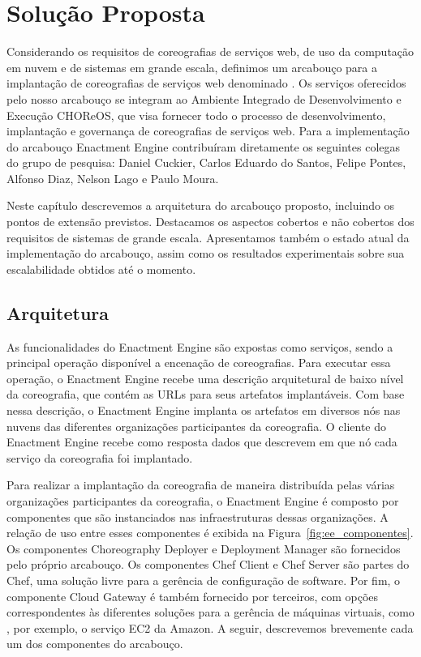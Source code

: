 
\chapter{Solução Proposta}
\label{cap:solucao}

Considerando os requisitos de coreografias de serviços web, de uso da computação em nuvem e de sistemas em grande escala, definimos um arcabouço para a implantação de coreografias de serviços web denominado \ee. Os serviços oferecidos pelo nosso arcabouço se integram ao Ambiente Integrado de Desenvolvimento e Execução CHOReOS, que visa fornecer todo o processo de desenvolvimento, implantação e governança de coreografias de serviços web. Para a implementação do arcabouço Enactment Engine contribuíram diretamente os seguintes colegas do grupo de pesquisa: Daniel Cuckier, Carlos Eduardo do Santos, Felipe Pontes, Alfonso Diaz, Nelson Lago e Paulo Moura. 

Neste capítulo descrevemos a arquitetura do arcabouço proposto, incluindo os pontos de extensão previstos. Destacamos os aspectos cobertos e não cobertos dos requisitos de sistemas de grande escala. Apresentamos também o estado atual da implementação do arcabouço, assim como os resultados experimentais sobre sua escalabilidade obtidos até o momento.

\section{Arquitetura}
\label{sec:arquitetura}

As funcionalidades do Enactment Engine são expostas como serviços, sendo a principal operação disponível a encenação de coreografias. Para executar essa operação, o Enactment Engine recebe uma descrição arquitetural de baixo nível da coreografia, que contém as URLs para seus artefatos implantáveis. Com base nessa descrição, o Enactment Engine implanta os artefatos em diversos nós nas nuvens das diferentes organizações participantes da coreografia. O cliente do Enactment Engine recebe como resposta dados que descrevem em que nó cada serviço da coreografia foi implantado.

Para realizar a implantação da coreografia de maneira distribuída pelas várias organizações participantes da coreografia, o Enactment Engine é composto por  componentes que são instanciados nas infraestruturas dessas organizações. A relação de uso entre esses componentes é exibida na Figura~\ref{fig:ee_componentes}. Os componentes Choreography Deployer e Deployment Manager são fornecidos pelo próprio arcabouço. Os componentes Chef Client e Chef Server são partes do Chef, uma solução livre para a gerência de configuração de software. Por fim, o componente Cloud Gateway é também fornecido por terceiros, com opções correspondentes às diferentes soluções para a gerência de máquinas virtuais, como , por exemplo, o serviço EC2 da Amazon. A seguir, descrevemos brevemente cada um dos componentes do arcabouço.

